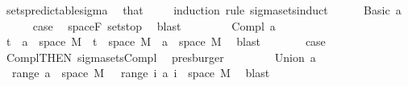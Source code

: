 \begin{isabellebody}
\ sets{\isacharunderscore}{\kern0pt}predictable{\isacharunderscore}{\kern0pt}sigma\ \isamarkupfalse%
\ that\ \isanewline
\ \ \isamarkupfalse%
\ {\isacharparenleft}{\kern0pt}induction\ rule{\isacharcolon}{\kern0pt}\ sigma{\isacharunderscore}{\kern0pt}sets{\isachardot}{\kern0pt}induct{\isacharparenright}{\kern0pt}\isanewline
\ \ \ \ \isamarkupfalse%
\ {\isacharparenleft}{\kern0pt}Basic\ a{\isacharparenright}{\kern0pt}\isanewline
\ \ \ \ \isamarkupfalse%
\ {\isacharquery}{\kern0pt}case\ \isamarkupfalse%
\ space{\isacharunderscore}{\kern0pt}F\ sets{\isachardot}{\kern0pt}top\ \isamarkupfalse%
\ blast\isanewline
\ \ \isamarkupfalse%
\isanewline
\ \ \ \ \isamarkupfalse%
\ {\isacharparenleft}{\kern0pt}Compl\ a{\isacharparenright}{\kern0pt}\isanewline
\ \ \ \ \isamarkupfalse%
\ {\isachardoublequoteopen}{\isacharparenleft}{\kern0pt}{\isacharbraceleft}{\kern0pt}t\ {\isacharminus}{\kern0pt}\ a{\isacharparenright}{\kern0pt}\ {\isasymtimes}\ space\ M\ {\isacharequal}{\kern0pt}\ {\isacharbraceleft}{\kern0pt}t\ {\isasymtimes}\ space\ M\ {\isacharminus}{\kern0pt}\ a\ {\isasymtimes}\ space\ M{\isachardoublequoteclose}\ \isamarkupfalse%
\ blast\isanewline
\ \ \ \ \isamarkupfalse%
\ \isamarkupfalse%
\ {\isacharquery}{\kern0pt}case\ \isamarkupfalse%
\ Compl{\isacharparenleft}{\kern0pt}{}{\isacharparenright}{\kern0pt}{\isacharbrackleft}{\kern0pt}THEN\ sigma{\isacharunderscore}{\kern0pt}sets{\isachardot}{\kern0pt}Compl{\isacharbrackright}{\kern0pt}\ \isamarkupfalse%
\ presburger\isanewline
\ \ \isamarkupfalse%
\isanewline
\ \ \ \ \isamarkupfalse%
\ {\isacharparenleft}{\kern0pt}Union\ a{\isacharparenright}{\kern0pt}\isanewline
\ \ \ \ \isamarkupfalse%
\ {\isachardoublequoteopen}{\isasymUnion}\ {\isacharparenleft}{\kern0pt}range\ a{\isacharparenright}{\kern0pt}\ {\isasymtimes}\ space\ M\ {\isacharequal}{\kern0pt}\ {\isasymUnion}\ {\isacharparenleft}{\kern0pt}range\ {\isacharparenleft}{\kern0pt}{\isasymlambda}i{\isachardot}{\kern0pt}\ a\ i\ {\isasymtimes}\ space\ M{\isacharparenright}{\kern0pt}{\isacharparenright}{\kern0pt}{\isachardoublequoteclose}\ \isamarkupfalse%
\ blast\isanewline

\end{isabellebody}
